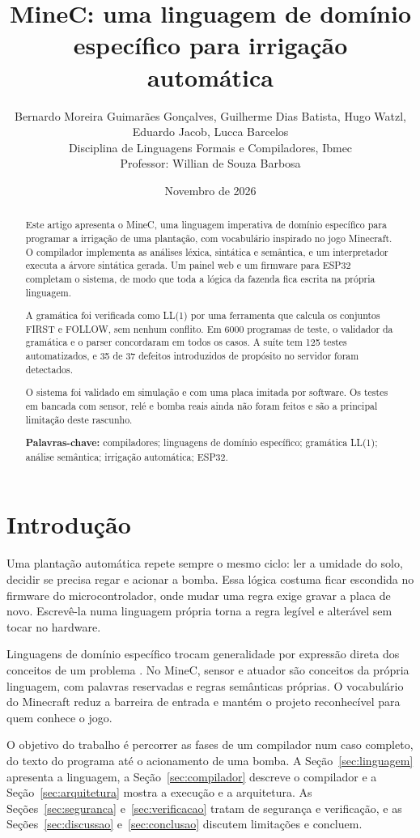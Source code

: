 \documentclass[11pt,a4paper]{article}
\title{\textbf{MineC: uma linguagem de domínio específico para irrigação automática}}
\author{
  Bernardo Moreira Guimarães Gonçalves, Guilherme Dias Batista, Hugo Watzl, \\
  Eduardo Jacob, Lucca Barcelos \\[8pt]
  \normalsize Disciplina de Linguagens Formais e Compiladores, Ibmec \\
  \normalsize Professor: Willian de Souza Barbosa
}
\date{Novembro de 2026}
\begin{document}
\maketitle

\begin{abstract}
Este artigo apresenta o MineC, uma linguagem imperativa de domínio específico para programar a irrigação de uma plantação, com vocabulário inspirado no jogo Minecraft. O compilador implementa as análises léxica, sintática e semântica, e um interpretador executa a árvore sintática gerada. Um painel web e um firmware para ESP32 completam o sistema, de modo que toda a lógica da fazenda fica escrita na própria linguagem.

A gramática foi verificada como LL(1) por uma ferramenta que calcula os conjuntos FIRST e FOLLOW, sem nenhum conflito. Em 6000 programas de teste, o validador da gramática e o parser concordaram em todos os casos. A suíte tem 125 testes automatizados, e 35 de 37 defeitos introduzidos de propósito no servidor foram detectados.

O sistema foi validado em simulação e com uma placa imitada por software. Os testes em bancada com sensor, relé e bomba reais ainda não foram feitos e são a principal limitação deste rascunho.

\medskip
\noindent\textbf{Palavras-chave:} compiladores; linguagens de domínio específico; gramática LL(1); análise semântica; irrigação automática; ESP32.
\end{abstract}

\section{Introdução}

Uma plantação automática repete sempre o mesmo ciclo: ler a umidade do solo, decidir se precisa regar e acionar a bomba. Essa lógica costuma ficar escondida no firmware do microcontrolador, onde mudar uma regra exige gravar a placa de novo. Escrevê-la numa linguagem própria torna a regra legível e alterável sem tocar no hardware.

Linguagens de domínio específico trocam generalidade por expressão direta dos conceitos de um problema \cite{mernik}. No MineC, sensor e atuador são conceitos da própria linguagem, com palavras reservadas e regras semânticas próprias. O vocabulário do Minecraft reduz a barreira de entrada e mantém o projeto reconhecível para quem conhece o jogo.

O objetivo do trabalho é percorrer as fases de um compilador num caso completo, do texto do programa até o acionamento de uma bomba. A Seção~\ref{sec:linguagem} apresenta a linguagem, a Seção~\ref{sec:compilador} descreve o compilador e a Seção~\ref{sec:arquitetura} mostra a execução e a arquitetura. As Seções~\ref{sec:seguranca} e~\ref{sec:verificacao} tratam de segurança e verificação, e as Seções~\ref{sec:discussao} e~\ref{sec:conclusao} discutem limitações e concluem.
\end{document}
